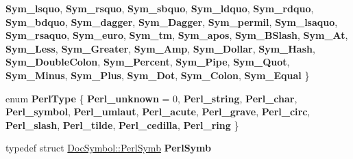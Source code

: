 \begin{DoxyCompactItemize}
{\bfseries Sym\+\_\+lsquo}, 
{\bfseries Sym\+\_\+rsquo}, 
{\bfseries Sym\+\_\+sbquo}, 
\newline
{\bfseries Sym\+\_\+ldquo}, 
{\bfseries Sym\+\_\+rdquo}, 
{\bfseries Sym\+\_\+bdquo}, 
{\bfseries Sym\+\_\+dagger}, 
\newline
{\bfseries Sym\+\_\+\+Dagger}, 
{\bfseries Sym\+\_\+permil}, 
{\bfseries Sym\+\_\+lsaquo}, 
{\bfseries Sym\+\_\+rsaquo}, 
\newline
{\bfseries Sym\+\_\+euro}, 
{\bfseries Sym\+\_\+tm}, 
{\bfseries Sym\+\_\+apos}, 
{\bfseries Sym\+\_\+\+B\+Slash}, 
\newline
{\bfseries Sym\+\_\+\+At}, 
{\bfseries Sym\+\_\+\+Less}, 
{\bfseries Sym\+\_\+\+Greater}, 
{\bfseries Sym\+\_\+\+Amp}, 
\newline
{\bfseries Sym\+\_\+\+Dollar}, 
{\bfseries Sym\+\_\+\+Hash}, 
{\bfseries Sym\+\_\+\+Double\+Colon}, 
{\bfseries Sym\+\_\+\+Percent}, 
\newline
{\bfseries Sym\+\_\+\+Pipe}, 
{\bfseries Sym\+\_\+\+Quot}, 
{\bfseries Sym\+\_\+\+Minus}, 
{\bfseries Sym\+\_\+\+Plus}, 
\newline
{\bfseries Sym\+\_\+\+Dot}, 
{\bfseries Sym\+\_\+\+Colon}, 
{\bfseries Sym\+\_\+\+Equal}
 \}
\item 
\mbox{\label{class_doc_symbol_a513eebcda007c5999064ab5de1d1e847}} 
enum {\bfseries Perl\+Type} \{ \newline
{\bfseries Perl\+\_\+unknown} = 0, 
{\bfseries Perl\+\_\+string}, 
{\bfseries Perl\+\_\+char}, 
{\bfseries Perl\+\_\+symbol}, 
\newline
{\bfseries Perl\+\_\+umlaut}, 
{\bfseries Perl\+\_\+acute}, 
{\bfseries Perl\+\_\+grave}, 
{\bfseries Perl\+\_\+circ}, 
\newline
{\bfseries Perl\+\_\+slash}, 
{\bfseries Perl\+\_\+tilde}, 
{\bfseries Perl\+\_\+cedilla}, 
{\bfseries Perl\+\_\+ring}
 \}
\item 
\mbox{\label{class_doc_symbol_af5533835fd3653c5f05411a0d9930d4c}} 
typedef struct \mbox{\hyperlink{struct_doc_symbol_1_1_perl_symb}{Doc\+Symbol\+::\+Perl\+Symb}} {\bfseries Perl\+Symb}
\end{DoxyCompactItemize}
